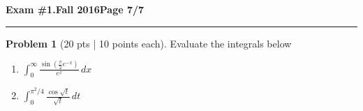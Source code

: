 \documentclass[12pt]{article}
\theoremstyle{definition}
\newtheorem{problem}{Problem}
\begin{document}
\hfill{\large\bf Exam \#1.}\hfill{\large\bf Fall 2016}\hfill{\large\bf Page 7/7}\hrule
 

\begin{problem}[20 pts | 10 points each]
Evaluate the integrals below

\begin{enumerate}
\item $\displaystyle{\int_0^{\infty} \frac{ \sin ( \tfrac{\pi}{2} e^{-x}) }{e^x} \, dx}$
\vspace{8cm}
\begin{flushright}
\end{flushright}
\item $\displaystyle{\int_0^{\pi^2/4} \frac{\cos \sqrt{t}}{\sqrt{t}}\, dt}$
\vspace{8cm}
\begin{flushright}
\end{flushright}
\end{enumerate}
\end{problem}
\end{document}
